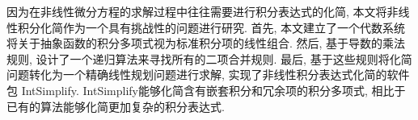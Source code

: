 因为在非线性微分方程的求解过程中往往需要进行积分表达式的化简, 本文将非线性积分化简作为一个具有挑战性的问题进行研究. 首先, 本文建立了一个代数系统将关于抽象函数的积分多项式视为标准积分项的线性组合. 然后, 基于导数的乘法规则, 设计了一个递归算法来寻找所有的二项合并规则. 最后, 基于这些规则将化简问题转化为一个精确线性规划问题进行求解, 实现了非线性积分表达式化简的软件包 IntSimplify.  IntSimplify能够化简含有嵌套积分和冗余项的积分多项式, 相比于已有的算法能够化简更加复杂的积分表达式. 


\bigskip

